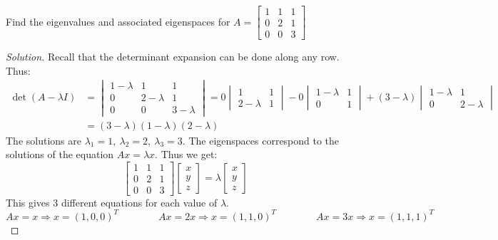 \documentclass[crop=false,class=book,oneside]{standalone}
\begin{document}
\begin{problem}
Find the eigenvalues and associated eigenspaces for $A = \begin{bmatrix} 1 & 1 & 1 \\ 0 & 2 & 1 \\ 0 & 0 & 3\end{bmatrix}$
\end{problem}
\begin{proof}[Solution]
Recall that the determinant expansion can be done along any row. Thus:
\begin{align*}
    \det(A-\lambda I) &= \begin{vmatrix} 1-\lambda & 1 & 1 \\ 0 & 2-\lambda & 1 \\ 0 & 0 & 3-\lambda \end{vmatrix}=0\begin{vmatrix} 1 & 1 \\ 2-\lambda & 1 \end{vmatrix}-0 \begin{vmatrix} 1-\lambda & 1 \\ 0 & 1 \end{vmatrix} + (3-\lambda)\begin{vmatrix} 1-\lambda & 1 \\ 0 & 2-\lambda\end{vmatrix}\\
    &= (3-\lambda)(1-\lambda)(2-\lambda)    
\end{align*}
The solutions are $\lambda_1 = 1,\ \lambda_2 = 2,\ \lambda_3 = 3$. The eigenspaces correspond to the solutions of the equation $Ax = \lambda x$. Thus we get:
\begin{equation*}
    \begin{bmatrix} 1 & 1 & 1 \\ 0 & 2 & 1 \\ 0 & 0 & 3 \end{bmatrix}\begin{bmatrix} x \\ y \\ z \end{bmatrix} = \lambda \begin{bmatrix}x \\ y \\ z\end{bmatrix}    
\end{equation*}
This gives 3 different equations for each value of $\lambda$.
\begin{equation*}
    Ax=x\Rightarrow x=(1,0,0)^{T}\quad\quad\quad\quad Ax=2x\Rightarrow x=(1,1,0)^{T}\quad\quad\quad\quad Ax=3x\Rightarrow x=(1,1,1)^{T}
\end{equation*}
\end{proof}
\end{document}

